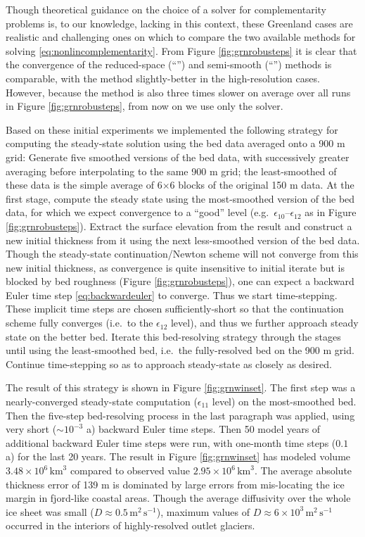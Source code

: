 \documentclass[review,letterpaper]{igs}
\newcommand\eps{\epsilon}
\begin{document}
Though theoretical guidance on the choice of a solver for complementarity problems is, to our knowledge, lacking in this context, these Greenland cases are realistic and challenging ones on which to compare the two available methods for solving \eqref{eq:nonlincomplementarity}.  From Figure \ref{fig:grnrobusteps} it is clear that the convergence of the reduced-space (``\virs'') and semi-smooth (``\viss'') methods is comparable, with the \virs method slightly-better in the high-resolution cases.  However, because the \viss method is also three times slower on average over all runs in Figure \ref{fig:grnrobusteps}, from now on we use only the \virs solver.

Based on these initial experiments we implemented the following strategy for computing the steady-state solution using the \MCB bed data averaged onto a 900 m grid:  Generate five smoothed versions of the bed data, with successively greater averaging before interpolating to the same 900 m grid; the least-smoothed of these data is the simple average of 6$\times$6 blocks of the original 150 m data.  At the first stage, compute the steady state using the most-smoothed version of the bed data, for which we expect convergence to a ``good'' level (e.g.~$\eps_{10}$--$\eps_{12}$ as in Figure \ref{fig:grnrobusteps}).  Extract the surface elevation from the result and construct a new initial thickness from it using the next less-smoothed version of the bed data.  Though the steady-state continuation/Newton scheme will not converge from this new initial thickness, as convergence is quite insensitive to initial iterate but is blocked by bed roughness (Figure \ref{fig:grnrobusteps}), one can expect a backward Euler time step \eqref{eq:backwardeuler} to converge.  Thus we start time-stepping.  These implicit time steps are chosen sufficiently-short so that the continuation scheme fully converges (i.e.~to the $\eps_{12}$ level), and thus we further approach steady state on the better bed.  Iterate this bed-resolving strategy through the stages until using the least-smoothed bed, i.e.~the fully-resolved bed on the 900 m grid.  Continue time-stepping so as to approach steady-state as closely as desired.

The result of this strategy is shown in Figure \ref{fig:grnwinset}.  The first step was a nearly-converged steady-state computation ($\eps_{11}$ level) on the most-smoothed bed.  Then the five-step bed-resolving process in the last paragraph was applied, using very short ($\sim10^{-3}$ a) backward Euler time steps.  Then 50 model years of additional backward Euler time steps were run, with one-month time steps ($0.1$ a) for the last 20 years.  The result in Figure \ref{fig:grnwinset} has modeled volume $3.48\times 10^6\,\text{km}^3$ compared to observed value $2.95\times 10^6\,\text{km}^3$.  The average absolute thickness error of 139 m is dominated by large errors from mis-locating the ice margin in fjord-like coastal areas.  Though the average diffusivity over the whole ice sheet was small ($D\approx 0.5\,\text{m}^2\,\text{s}^{-1}$), maximum values of $D\approx 6\times 10^3\,\text{m}^2\,\text{s}^{-1}$ occurred in the interiors of highly-resolved outlet glaciers.
\end{document}
